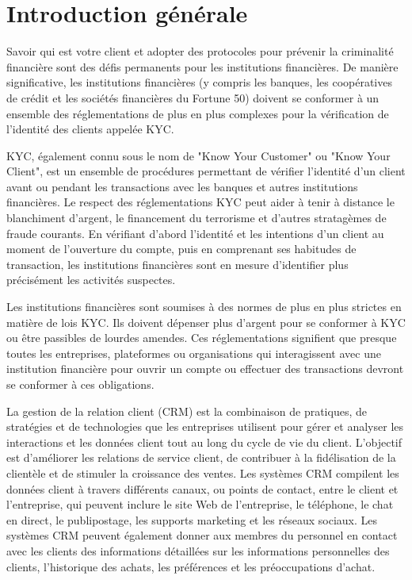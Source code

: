 \let\cleardoublepage\clearpage

\chapter{Introduction générale}
\label{sec:DescriptionDuProjet}

Savoir qui est votre client et adopter des protocoles pour prévenir la criminalité financière sont des défis permanents pour les institutions financières. De manière significative, les institutions financières (y compris les banques, les coopératives de crédit et les sociétés financières du Fortune 50) doivent se conformer à un ensemble des réglementations de plus en plus complexes pour la vérification de l'identité des clients appelée KYC.

KYC, également connu sous le nom de "Know Your Customer" ou "Know Your Client", est un ensemble de procédures permettant de vérifier l'identité d'un client avant ou pendant les transactions avec les banques et autres institutions financières. Le respect des réglementations KYC peut aider à tenir à distance le blanchiment d'argent, le financement du terrorisme et d'autres stratagèmes de fraude courants. En vérifiant d'abord l'identité et les intentions d'un client au moment de l'ouverture du compte, puis en comprenant ses habitudes de transaction, les institutions financières sont en mesure d'identifier plus précisément les activités suspectes. 

Les institutions financières sont soumises à des normes de plus en plus strictes en matière de lois KYC. Ils doivent dépenser plus d'argent pour se conformer à KYC ou être passibles de lourdes amendes. Ces réglementations signifient que presque toutes les entreprises, plateformes ou organisations qui interagissent avec une institution financière pour ouvrir un compte ou effectuer des transactions devront se conformer à ces obligations.

La gestion de la relation client (CRM) est la combinaison de pratiques, de stratégies et de technologies que les entreprises utilisent pour gérer et analyser les interactions et les données client tout au long du cycle de vie du client. L'objectif est d'améliorer les relations de service client, de contribuer à la fidélisation de la clientèle et de stimuler la croissance des ventes. Les systèmes CRM compilent les données client à travers différents canaux, ou points de contact, entre le client et l'entreprise, qui peuvent inclure le site Web de l'entreprise, le téléphone, le chat en direct, le publipostage, les supports marketing et les réseaux sociaux. Les systèmes CRM peuvent également donner aux membres du personnel en contact avec les clients des informations détaillées sur les informations personnelles des clients, l'historique des achats, les préférences et les préoccupations d'achat.


